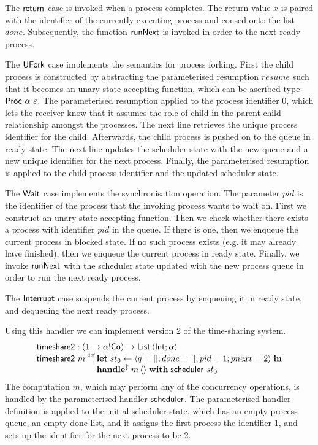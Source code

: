 \documentclass[12pt,phd,lfcs,twoside,openright,logo,leftchapter,normalheadings]{infthesis}
\theoremstyle{plain}
\theoremstyle{definition}
\begin{document}
The $\mathsf{return}$ case is invoked when a process completes. The return
value $x$ is paired with the identifier of the currently executing
process and consed onto the list $done$. Subsequently, the function
$\mathsf{runNext}$ is invoked in order to the next ready process.

The $\mathsf{UFork}$ case implements the semantics for process forking. First
the child process is constructed by abstracting the parameterised
resumption $resume$ such that it becomes an unary state-accepting
function, which can be ascribed type $\mathsf{Proc}~\alpha~\varepsilon$. The
parameterised resumption applied to the process identifier $0$, which
lets the receiver know that it assumes the role of child in the
parent-child relationship amongst the processes. The next line
retrieves the unique process identifier for the child. Afterwards, the
child process is pushed on to the queue in ready state. The next line
updates the scheduler state with the new queue and a new unique
identifier for the next process. Finally, the parameterised resumption
is applied to the child process identifier and the updated scheduler
state.

The $\mathsf{Wait}$ case implements the synchronisation operation. The
parameter $pid$ is the identifier of the process that the invoking
process wants to wait on. First we construct an unary state-accepting
function. Then we check whether there exists a process with identifier
$pid$ in the queue. If there is one, then we enqueue the current
process in blocked state. If no such process exists (e.g. it may
already have finished), then we enqueue the current process in ready
state. Finally, we invoke $\mathsf{runNext}$ with the scheduler state updated
with the new process queue in order to run the next ready process.

The $\mathsf{Interrupt}$ case suspends the current process by enqueuing it in
ready state, and dequeuing the next ready process.

Using this handler we can implement version 2 of the time-sharing
system.
%
\[
  \bl
    \timesharee : (\UnitType \to \alpha \eff \Co) \to \List\,\Record{\Int;\alpha}\\
    \timesharee~m \defas
      \bl
        \Let\;st_0 \revto \Record{q=\nil;done=\nil;pid=1;pnext=2}\;\In\\
        \ParamHandle\;m\,\Unit\;\With\; \scheduler~st_0
      \el
  \el
\]
%
The computation $m$, which may perform any of the concurrency
operations, is handled by the parameterised handler $\mathsf{scheduler}$. The
parameterised handler definition is applied to the initial scheduler
state, which has an empty process queue, an empty done list, and it
assigns the first process the identifier $1$, and sets up the
identifier for the next process to be $2$.
\end{document}
